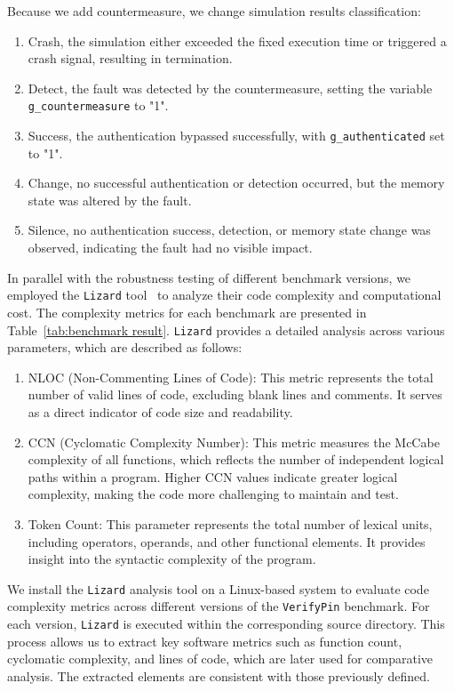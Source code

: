 Because we add countermeasure, we change simulation results classification:
\begin{enumerate}
\item Crash, the simulation either exceeded the fixed execution time or triggered a crash signal, resulting in termination.
\item Detect, the fault was detected by the countermeasure, setting the variable \texttt{g\_countermeasure} to "1".
\item Success, the authentication bypassed successfully, with \texttt{g\_authenticated} set to "1".
\item Change, no successful authentication or detection occurred, but the memory state was altered by the fault.
\item Silence, no authentication success, detection, or memory state change was observed, indicating the fault had no visible impact.
\end{enumerate}

In parallel with the robustness testing of different benchmark versions, we employed the \texttt{Lizard} tool~\cite{Lizard} to analyze their code complexity and computational cost. The complexity metrics for each benchmark are presented in Table~\ref{tab:benchmark result}. \texttt{Lizard} provides a detailed analysis across various parameters, which are described as follows:
\begin{enumerate}
\item NLOC (Non-Commenting Lines of Code): This metric represents the total number of valid lines of code, excluding blank lines and comments. It serves as a direct indicator of code size and readability.

\item CCN (Cyclomatic Complexity Number): This metric measures the McCabe complexity of all functions, which reflects the number of independent logical paths within a program. Higher CCN values indicate greater logical complexity, making the code more challenging to maintain and test.

\item Token Count: This parameter represents the total number of lexical units, including operators, operands, and other functional elements. It provides insight into the syntactic complexity of the program.
\end{enumerate}

We install the \texttt{Lizard} analysis tool on a Linux-based system to evaluate code complexity metrics across different versions of the \texttt{VerifyPin} benchmark. For each version, \texttt{Lizard} is executed within the corresponding source directory. This process allows us to extract key software metrics such as function count, cyclomatic complexity, and lines of code, which are later used for comparative analysis. The extracted elements are consistent with those previously defined.

